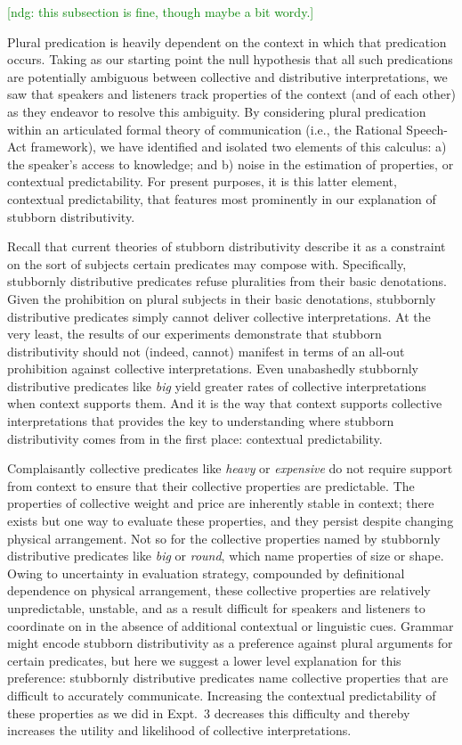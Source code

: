 \documentclass[linguex]{sp}
\newcommand{\ndg}[1]{\textcolor{Green}{[ndg: #1]}}
\begin{document}
\ndg{this subsection is fine, though maybe a bit wordy.}

Plural predication is heavily dependent on the context in which that predication occurs. Taking as our starting point the null hypothesis that all such predications are potentially ambiguous between collective and distributive interpretations, we saw that speakers and listeners track properties of the context (and of each other) as they endeavor to resolve this ambiguity. By considering plural predication within an articulated formal theory of communication (i.e., the Rational Speech-Act framework), we have identified and isolated two elements of this calculus: a) the speaker's access to knowledge; and b) noise in the estimation of properties, or contextual predictability. For present purposes, it is this latter element, contextual predictability, that features most prominently in our explanation of stubborn distributivity.

Recall that current theories of stubborn distributivity describe it as a constraint on the sort of subjects certain predicates may compose with. Specifically, stubbornly distributive predicates refuse pluralities from their basic denotations. 
Given the prohibition on plural subjects in their basic denotations, stubbornly distributive predicates simply cannot deliver collective interpretations. At the very least, the results of our experiments demonstrate that stubborn distributivity should not (indeed, cannot) manifest in terms of an all-out prohibition against collective interpretations. Even unabashedly stubbornly distributive predicates like \emph{big} yield greater rates of collective interpretations when context supports them. And it is the way that context supports collective interpretations that provides the key to understanding where stubborn distributivity comes from in the first place: contextual predictability.

Complaisantly collective predicates like \emph{heavy} or \emph{expensive} do not require support from context to ensure that their collective properties are predictable. The properties of collective weight and price are inherently stable in context; there exists but one way to evaluate these properties, and they persist despite changing physical arrangement. Not so for the collective properties named by stubbornly distributive predicates like \emph{big} or \emph{round}, which name properties of size or shape. Owing to uncertainty in evaluation strategy, compounded by definitional dependence on physical arrangement, these collective properties are relatively unpredictable, unstable, and as a result difficult for speakers and listeners to coordinate on in the absence of additional contextual or linguistic cues. Grammar might encode stubborn distributivity as a preference against plural arguments for certain predicates, but here we suggest a lower level explanation for this preference: stubbornly distributive predicates name collective properties that are difficult to accurately communicate. Increasing the contextual predictability of these properties as we did in Expt.~3 decreases this difficulty and thereby increases the utility and likelihood of collective interpretations.
\end{document}
